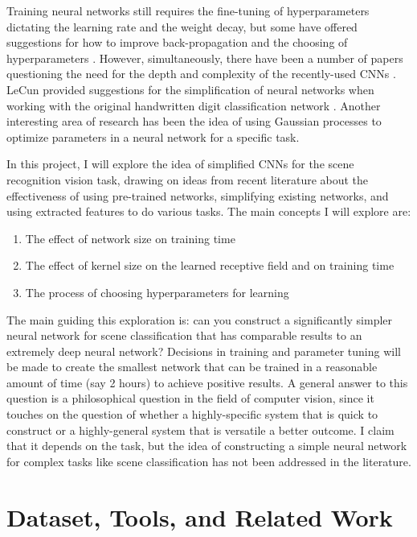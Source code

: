 \documentclass[10pt]{article}
\begin{document}
Training neural networks still requires the fine-tuning of hyperparameters dictating the learning rate and the weight decay, but some have offered suggestions for how to improve back-propagation and the choosing of hyperparameters \cite{bottou_large-scale_2010}. However, simultaneously, there have been a number of papers questioning the need for the depth and complexity of the recently-used CNNs \cite{ba_deep_2013}. LeCun provided suggestions for the simplification of neural networks when working with the original handwritten digit classification network \cite{lecun_optimal_1989}. Another interesting area of research has been the idea of using Gaussian processes to optimize parameters in a neural network for a specific task. 

In this project, I will explore the idea of simplified CNNs for the scene recognition vision task, drawing on ideas from recent literature about the effectiveness of using pre-trained networks, simplifying existing networks, and using extracted features to do various tasks. The main concepts I will explore are: 

\begin{enumerate}
	\item The effect of network size on training time 
	\item The effect of kernel size on the learned receptive field and on training time
	\item The process of choosing hyperparameters for learning
\end{enumerate}

The main guiding this exploration is: can you construct a significantly simpler neural network for scene classification that has comparable results to an extremely deep neural network? Decisions in training and parameter tuning will be made to create the smallest network that can be trained in a reasonable amount of time (say 2 hours) to achieve positive results. A general answer to this question is a philosophical question in the field of computer vision, since it touches on the question of whether a highly-specific system that is quick to construct or a highly-general system that is versatile a better outcome. I claim that it depends on the task, but the idea of constructing a simple neural network for complex tasks like scene classification has not been addressed in the literature.

\section{Dataset, Tools, and Related Work}
\end{document}
